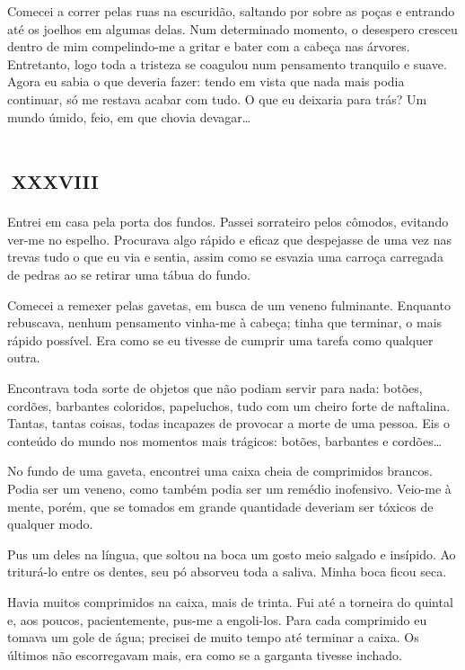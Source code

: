 Comecei a correr pelas ruas na escuridão, saltando por sobre as poças e entrando até os joelhos em algumas delas.
Num determinado momento, o desespero cresceu dentro de mim compelindo-me a gritar e bater com a cabeça nas árvores. Entretanto, logo toda a tristeza se coagulou num pensamento tranquilo e suave. Agora eu sabia o que deveria fazer: tendo em vista que nada mais podia continuar, só me restava acabar com tudo. O que eu deixaria para trás? Um mundo úmido, feio, em que chovia devagar\ldots{}


\chapter*{\small{}\,\Large\centering\textsc{xxxviii}\,\small{}}

Entrei em casa pela porta dos fundos. Passei sorrateiro pelos cômodos, evitando ver-me no espelho. Procurava algo rápido e eficaz que despejasse de uma vez nas trevas tudo o que eu via e sentia, assim como se esvazia uma carroça carregada de pedras ao se retirar uma tábua do fundo.

Comecei a remexer pelas gavetas, em busca de um veneno fulminante. Enquanto rebuscava, nenhum pensamento vinha-me à cabeça; tinha que terminar, o mais rápido possível. Era como se eu tivesse de cumprir uma tarefa como qualquer outra. 

Encontrava toda sorte de objetos que não podiam servir para nada: botões, cordões, barbantes coloridos, papeluchos, tudo com um cheiro forte de naftalina. Tantas, tantas coisas, todas incapazes de provocar a morte de uma pessoa. Eis o conteúdo do mundo nos momentos mais trágicos: botões, barbantes e cordões\ldots{}

No fundo de uma gaveta, encontrei uma caixa cheia de comprimidos brancos. Podia ser um veneno, como também podia ser um remédio inofensivo. Veio-me à mente, porém, que se tomados em grande quantidade deveriam ser tóxicos de qualquer modo.

Pus um deles na língua, que soltou na boca um gosto meio salgado e insípido. Ao triturá-lo entre os dentes, seu pó absorveu toda a saliva. Minha boca ficou seca.

Havia muitos comprimidos na caixa, mais de trinta. Fui até a torneira do quintal e, aos poucos, pacientemente, pus-me a engoli-los.
Para cada comprimido eu tomava um gole de água; precisei de muito tempo até terminar a caixa. Os últimos não escorregavam mais, era como se a garganta tivesse inchado.

